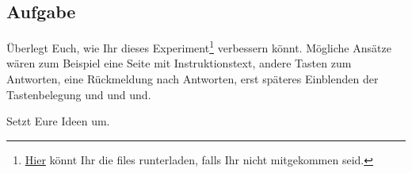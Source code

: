 \documentclass[
]{book}
\begin{document}
\hypertarget{aufgabe-13}{%
\subsection{Aufgabe}\label{aufgabe-13}}

Überlegt Euch, wie Ihr dieses Experiment\footnote{\href{https://gitlab.pavlovia.org/M.Brede/ms_fov_stroop}{Hier} könnt Ihr die files runterladen, falls Ihr nicht mitgekommen seid.} verbessern könnt.
Mögliche Ansätze wären zum Beispiel eine Seite mit Instruktionstext, andere Tasten zum Antworten, eine Rückmeldung nach Antworten, erst späteres Einblenden der Tastenbelegung und und und.

Setzt Eure Ideen um.

  
\end{document}
